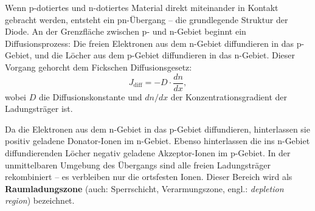 ﻿\documentclass[12pt, a4paper]{article}
\begin{document}
	Wenn p-dotiertes und n-dotiertes Material direkt miteinander in Kontakt gebracht
	werden, entsteht ein pn-Übergang -- die grundlegende Struktur der Diode. An
	der Grenzfläche zwischen p- und n-Gebiet beginnt ein Diffusionsprozess: Die
	freien Elektronen aus dem n-Gebiet diffundieren in das p-Gebiet, und die Löcher
	aus dem p-Gebiet diffundieren in das n-Gebiet. Dieser Vorgang gehorcht dem
	Fickschen Diffusionsgesetz:
	\begin{equation}
		J_{\mathrm{diff}} = -D \cdot \frac{dn}{dx},
	\end{equation}
	wobei $D$ die Diffusionskonstante und $dn/dx$ der Konzentrationsgradient der
	Ladungsträger ist.
	
	Da die Elektronen aus dem n-Gebiet in das p-Gebiet diffundieren, hinterlassen
	sie positiv geladene Donator-Ionen im n-Gebiet. Ebenso hinterlassen die ins
	n-Gebiet diffundierenden Löcher negativ geladene Akzeptor-Ionen im p-Gebiet.
	In der unmittelbaren Umgebung des Übergangs sind alle freien Ladungsträger
	rekombiniert -- es verbleiben nur die ortsfesten Ionen. Dieser Bereich wird als
	\textbf{Raumladungszone} (auch: Sperrschicht, Verarmungszone, engl.:
	\textit{depletion region}) bezeichnet.
	
\end{document}
